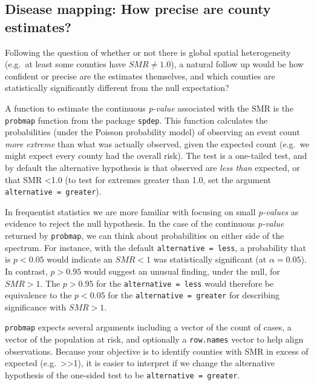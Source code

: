 \documentclass[
]{book}
\newenvironment{rmdnote}[1]
  {
  \begin{itemize}
  \renewcommand{\labelitemi}{
    \raisebox{-.7\height}[0pt][0pt]{
      {\setkeys{Gin}{width=3em,keepaspectratio}\texttt{[image: images/\#1]}}
    }
  }
  \setlength{\fboxsep}{1em}
  \begin{note}
  \item
  }
  {
  \end{note}
  \end{itemize}
  }
\begin{document}
\hypertarget{disease-mapping-how-precise-are-county-estimates}{%
\subsection{Disease mapping: How precise are county estimates?}\label{disease-mapping-how-precise-are-county-estimates}}

Following the question of whether or not there is global spatial heterogeneity (e.g.~at least some counties have \(SMR\neq 1.0\)), a natural follow up would be how confident or precise are the estimates themselves, and which counties are statistically significantly different from the null expectation?

A function to estimate the continuous \emph{p-value} associated with the SMR is the \texttt{probmap} function from the package \texttt{spdep}. This function calculates the probabilities (under the Poisson probability model) of observing an event count \emph{more extreme} than what was actually observed, given the expected count (e.g.~we might expect every county had the overall risk). The test is a one-tailed test, and by default the alternative hypothesis is that observed are \emph{less than} expected, or that SMR \textless1.0 (to test for extremes greater than 1.0, set the argument \texttt{alternative\ =\ \textquotesingle{}greater\textquotesingle{}}).

\begin{rmdnote}{note}
In frequentist statistics we are more familiar with focusing on small \emph{p-values} as evidence to reject the null hypothesis. In the case of the continuous \emph{p-value} returned by \texttt{probmap}, we can think about probabilities on either side of the spectrum. For instance, with the default \texttt{alternative\ =\ \textquotesingle{}less\textquotesingle{}}, a probability that is \(p<0.05\) would indicate an \(SMR<1\) was statistically significant (at \(\alpha=0.05\)). In contrast, \(p>0.95\) would suggest an unusual finding, under the null, for \(SMR>1\). The \(p>0.95\) for the \texttt{alternative\ =\ \textquotesingle{}less\textquotesingle{}} would therefore be equivalence to the \(p<0.05\) for the \texttt{alternative\ =\ \textquotesingle{}greater\textquotesingle{}} for describing significance with \(SMR>1\).

\end{rmdnote}

\texttt{probmap} expects several arguments including a vector of the count of cases, a vector of the population at risk, and optionally a \texttt{row.names} vector to help align observations. Because your objective is to identify counties with SMR in excess of expected (e.g.~\textgreater\textgreater1), it is easier to interpret if we change the alternative hypothesis of the one-sided test to be \texttt{alternative\ =\ \textquotesingle{}greater\textquotesingle{}}.
\end{document}
